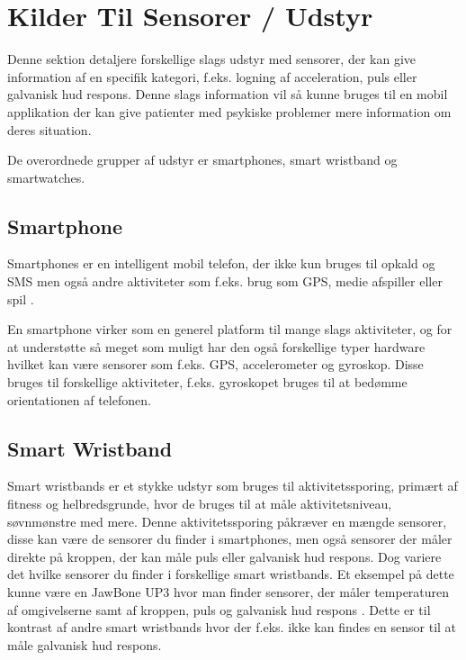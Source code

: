 \section{Kilder Til Sensorer / Udstyr}\label{sec:kilder-til-sensorer}
Denne sektion detaljere forskellige slags udstyr med sensorer, der kan give information af en specifik kategori, f.eks. logning af acceleration, puls eller galvanisk hud respons.
Denne slags information vil så kunne bruges til en mobil applikation der kan give patienter med psykiske problemer mere information om deres situation.

De overordnede grupper af udstyr er smartphones, smart wristband og smartwatches. 

\subsection{Smartphone}
Smartphones er en intelligent mobil telefon, der ikke kun bruges til opkald og SMS men også andre aktiviteter som f.eks. brug som GPS, medie afspiller eller spil \citep{misc:smartphone}.

En smartphone virker som en generel platform til mange slags aktiviteter, og for at understøtte så meget som muligt har den også forskellige typer hardware hvilket kan være sensorer som f.eks. GPS, accelerometer og gyroskop. Disse bruges til forskellige aktiviteter, f.eks. gyroskopet bruges til at bedømme orientationen af telefonen. 

\subsection{Smart Wristband} %
Smart wristbands er et stykke udstyr som bruges til aktivitetssporing, primært af fitness og helbredsgrunde, hvor de bruges til at måle aktivitetsniveau, søvnmønstre med mere.
Denne aktivitetssporing påkræver en mængde sensorer, disse kan være de sensorer du finder i smartphones, men også sensorer der måler direkte på kroppen, der kan måle puls eller galvanisk hud respons. 
Dog variere det hvilke sensorer du finder i forskellige smart wristbands.
Et eksempel på dette kunne være en JawBone UP3 hvor man finder sensorer, der måler temperaturen af omgivelserne samt af kroppen, puls og galvanisk hud respons \citep{misc:jawboneup3sensors}. 
Dette er til kontrast af andre smart wristbands hvor der f.eks. ikke kan findes en sensor til at måle galvanisk hud respons.

